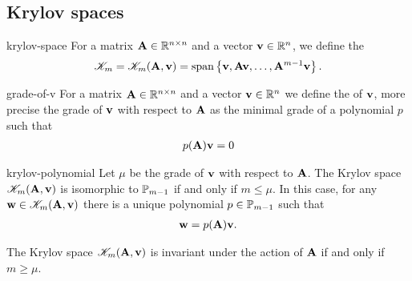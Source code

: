 \subsection{Krylov spaces}

\begin{Definition}{krylov-space}
  For a matrix $\mata\in\Rnn$ and a vector $\vv\in\R^n$, we define the
  \begin{gather}
    \krylov_m = \krylov_m(\mata,\vv)
    = \spann{\vv,\mata\vv,\dots,\mata^{m-1}\vv}.
  \end{gather}
\end{Definition}

\begin{Definition}{grade-of-v}
  For a matrix $\mata\in\Rnn$ and a vector $\vv\in\R^n$ we define the
   of $\vv$, more precise the grade of $\vv$ with
  respect to $\mata$ as the minimal grade of a polynomial $p$ such
  that
  \begin{gather}
    p(\mata)\vv = 0
  \end{gather}
\end{Definition}

\begin{Lemma}{krylov-polynomial}
  Let $\mu$ be the grade of $\vv$ with respect to $\mata$.  The Krylov
  space $\krylov_m(\mata,\vv)$ is isomorphic to $\P_{m-1}$ if and only
  if $m\le \mu$. In this case, for any $\vw\in\krylov_m(\mata,\vv)$
  there is a unique polynomial $p\in\P_{m-1}$ such that
  \begin{gather}
    \label{eq:krylov-polynomial-1}
    \vw = p(\mata)\vv.
  \end{gather}

  The Krylov space $\krylov_m(\mata,\vv)$ is invariant under the
  action of $\mata$ if and only if $m\ge\mu$.
\end{Lemma}

